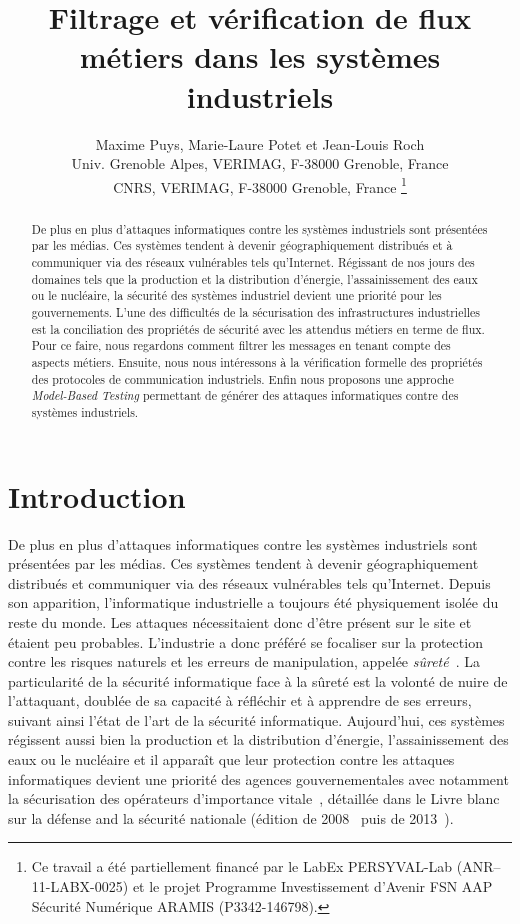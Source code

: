 \documentclass{article}
\title{Filtrage et vérification de flux métiers dans les systèmes industriels}
\author{
    Maxime Puys, Marie-Laure Potet et Jean-Louis Roch\\
    Univ. Grenoble Alpes, VERIMAG, F-38000 Grenoble, France\\
    CNRS, VERIMAG, F-38000 Grenoble, France
    \thanks{Ce travail a été partiellement financé par le LabEx PERSYVAL-Lab
    (ANR–11-LABX-0025) et le projet Programme Investissement d’Avenir FSN AAP
    Sécurité Numérique \no 3 ARAMIS (P3342-146798).}
}
\date{}
\begin{document}
\maketitle

\begin{abstract}
    De plus en plus d’attaques informatiques contre les systèmes industriels
    sont présentées par les médias.
    Ces systèmes tendent à devenir géographiquement distribués et à communiquer
    via des réseaux vulnérables tels qu’Internet.
    Régissant de nos jours des domaines tels que la production et la
    distribution d'énergie, l'assainissement des eaux ou le nucléaire, la
    sécurité des systèmes industriel devient une priorité pour les gouvernements.
    L'une des difficultés de la sécurisation des infrastructures industrielles est
    la conciliation des propriétés de sécurité avec les attendus métiers en
    terme de flux.
    Pour ce faire, nous regardons comment filtrer les messages en tenant compte
    des aspects métiers.
    Ensuite, nous nous intéressons à la vérification formelle des propriétés
    des protocoles de communication industriels.
    Enfin nous proposons une approche {\em Model-Based Testing} permettant de
    générer des attaques informatiques contre des systèmes industriels.
\end{abstract}

\section{Introduction}

De plus en plus d'attaques informatiques contre les systèmes industriels sont
présentées par les médias.
Ces systèmes tendent à devenir géographiquement distribués et communiquer via
des réseaux vulnérables tels qu'Internet.
Depuis son apparition, l'informatique industrielle a toujours été physiquement
isolée du reste du monde.
Les attaques nécessitaient donc d'être présent sur le site et étaient peu
probables.
L'industrie a donc préféré se focaliser sur la protection contre les risques
naturels et les erreurs de manipulation, appelée {\em sûreté}~\cite{Pie10,PS09,
IAEA96}.
La particularité de la sécurité informatique face à la sûreté est la volonté
de nuire de l'attaquant, doublée de sa capacité à réfléchir et à apprendre de
ses erreurs, suivant ainsi l'état de l'art de la sécurité informatique.
Aujourd'hui, ces systèmes régissent aussi bien la production et la distribution
d'énergie, l'assainissement des eaux ou le nucléaire et il apparaît que leur
protection contre les attaques informatiques devient une priorité des agences
gouvernementales avec notamment la sécurisation des opérateurs d'importance
vitale~\cite{Leg07_oiv}, détaillée dans le Livre blanc sur la défense and la
sécurité nationale (édition de 2008~\cite{LivreBlanc08} puis de
2013~\cite{LivreBlanc13}).
\end{document}
